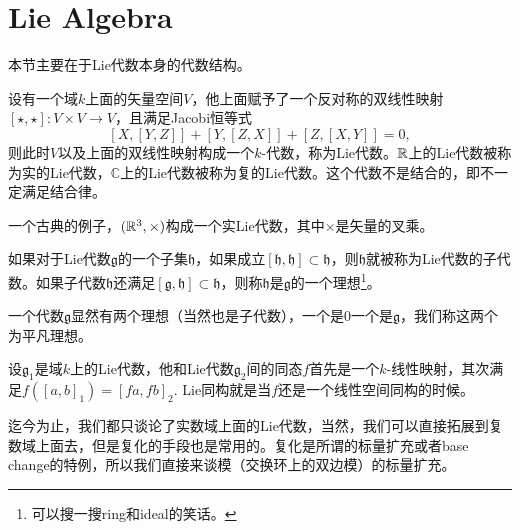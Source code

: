 \documentclass[10pt]{article}
\newcommand{\cc}{\mathbb{C}}
\newcommand{\lag}{{\mathfrak{g}}}
\begin{document}
\newpage

\section{Lie Algebra}

本节主要在于Lie代数本身的代数结构。

\para 设有一个域$k$上面的矢量空间$V$，他上面赋予了一个反对称的双线性映射$[\star,\star]:V\times V\to V$，且满足Jacobi恒等式
\[
[X,[Y,Z]]+[Y,[Z,X]]+[Z,[X,Y]]=0,
\]
则此时$V$以及上面的双线性映射构成一个$k$-代数，称为Lie代数。$\mathbb{R}$上的Lie代数被称为实的Lie代数，$\cc$上的Lie代数被称为复的Lie代数。这个代数不是结合的，即不一定满足结合律。

一个古典的例子，$(\mathbb{R}^3,\times)$构成一个实Lie代数，其中$\times$是矢量的叉乘。

\para 如果对于Lie代数$\lag$的一个子集$\mathfrak{h}$，如果成立$[\mathfrak{h},\mathfrak{h}]\subset \mathfrak{h}$，则$\mathfrak{h}$就被称为Lie代数的子代数。如果子代数$\mathfrak{h}$还满足$[\lag,\mathfrak{h}]\subset \mathfrak{h}$，则称$\mathfrak{h}$是$\lag$的一个{\kaishu 理想}\footnote{可以搜一搜ring和ideal的笑话。}。

一个代数$\lag$显然有两个理想（当然也是子代数），一个是$0$一个是$\lag$，我们称这两个为平凡理想。



\para 设$\lag_1$是域$k$上的Lie代数，他和Lie代数$\lag_2$间的同态$f$首先是一个$k$-线性映射，其次满足$f([a,b]_1)=[fa,fb]_2$. Lie同构就是当$f$还是一个线性空间同构的时候。

迄今为止，我们都只谈论了实数域上面的Lie代数，当然，我们可以直接拓展到复数域上面去，但是复化的手段也是常用的。复化是所谓的标量扩充或者base change的特例，所以我们直接来谈模（交换环上的双边模）的标量扩充。
\end{document}
